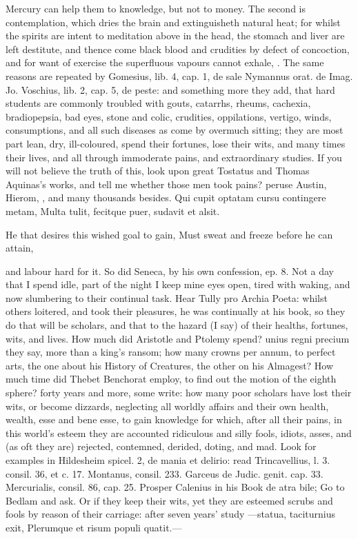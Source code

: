 {Mercury can help them to knowledge, but not to money. The second is
contemplation, which dries the brain and extinguisheth natural
heat; for whilst the spirits are intent to meditation above in the
head, the stomach and liver are left destitute, and thence come black
blood and crudities by defect of concoction, and for want of exercise
the superfluous vapours cannot exhale, \etc{}. The same reasons are
repeated by Gomesius, lib. 4, cap. 1, de sale Nymannus orat. de
Imag. Jo. Voschius, lib. 2, cap. 5, de peste: and something more they
add, that hard students are commonly troubled with gouts, catarrhs,
rheums, cachexia, bradiopepsia, bad eyes, stone and colic,
crudities, oppilations, vertigo, winds, consumptions, and all
such diseases as come by overmuch sitting; they are most part lean,
dry, ill-coloured, spend their fortunes, lose their wits, and many
times their lives, and all through immoderate pains, and extraordinary
studies. If you will not believe the truth of this, look upon great
Tostatus and Thomas Aquinas's works, and tell me whether those men took
pains? peruse Austin, Hierom, \etc{}, and many thousands besides.
Qui cupit optatam cursu contingere metam,
Multa tulit, fecitque puer, sudavit et alsit.

He that desires this wished goal to gain,
Must sweat and freeze before he can attain,

and labour hard for it. So did Seneca, by his own confession, ep. 8.
Not a day that I spend idle, part of the night I keep mine eyes
open, tired with waking, and now slumbering to their continual task.
Hear Tully pro Archia Poeta: whilst others loitered, and took their
pleasures, he was continually at his book, so they do that will be
scholars, and that to the hazard (I say) of their healths, fortunes,
wits, and lives. How much did Aristotle and Ptolemy spend? unius regni
precium they say, more than a king's ransom; how many crowns per annum,
to perfect arts, the one about his History of Creatures, the other on
his Almagest? How much time did Thebet Benchorat employ, to find out
the motion of the eighth sphere? forty years and more, some write: how
many poor scholars have lost their wits, or become dizzards, neglecting
all worldly affairs and their own health, wealth, esse and bene esse,
to gain knowledge for which, after all their pains, in this world's
esteem they are accounted ridiculous and silly fools, idiots, asses,
and (as oft they are) rejected, contemned, derided, doting, and mad.
Look for examples in Hildesheim spicel. 2, de mania et delirio: read
Trincavellius, l. 3. consil. 36, et c. 17. Montanus, consil. 233.
Garceus de Judic. genit. cap. 33. Mercurialis, consil. 86, cap.
25. Prosper Calenius in his Book de atra bile; Go to Bedlam and
ask. Or if they keep their wits, yet they are esteemed scrubs and fools
by reason of their carriage: after seven years' study
---statua, taciturnius exit,
Plerumque et risum populi quatit.---

}
